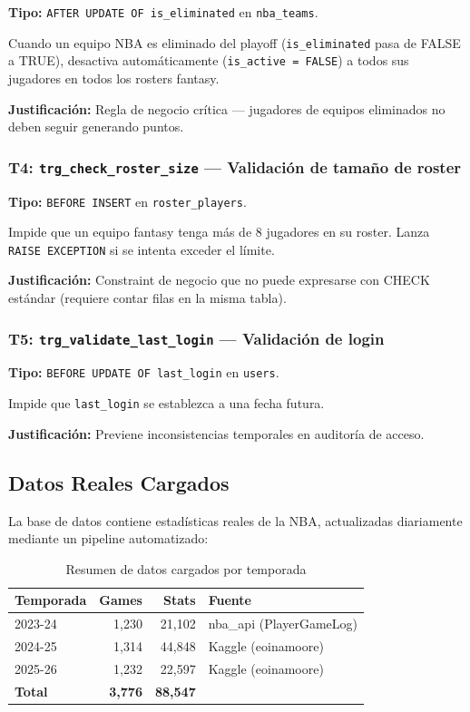 \documentclass[12pt,a4paper]{article}
\begin{document}
\textbf{Tipo:} \texttt{AFTER UPDATE OF is\_eliminated} en \texttt{nba\_teams}.

Cuando un equipo NBA es eliminado del playoff (\texttt{is\_eliminated} pasa de FALSE a TRUE),
desactiva autom\'aticamente (\texttt{is\_active = FALSE}) a todos sus jugadores en todos los rosters fantasy.

\textbf{Justificaci\'on:} Regla de negocio cr\'itica --- jugadores de equipos eliminados no deben seguir generando puntos.

\subsubsection{T4: \texttt{trg\_check\_roster\_size} --- Validaci\'on de tama\~no de roster}

\textbf{Tipo:} \texttt{BEFORE INSERT} en \texttt{roster\_players}.

Impide que un equipo fantasy tenga m\'as de 8 jugadores en su roster.
Lanza \texttt{RAISE EXCEPTION} si se intenta exceder el l\'imite.

\textbf{Justificaci\'on:} Constraint de negocio que no puede expresarse con CHECK est\'andar
(requiere contar filas en la misma tabla).

\subsubsection{T5: \texttt{trg\_validate\_last\_login} --- Validaci\'on de login}

\textbf{Tipo:} \texttt{BEFORE UPDATE OF last\_login} en \texttt{users}.

Impide que \texttt{last\_login} se establezca a una fecha futura.

\textbf{Justificaci\'on:} Previene inconsistencias temporales en auditor\'ia de acceso.

\subsection{Datos Reales Cargados}

La base de datos contiene estad\'isticas reales de la NBA, actualizadas diariamente
mediante un pipeline automatizado:

\begin{table}[h!]
\centering
\begin{tabular}{lrrl}
\toprule
\textbf{Temporada} & \textbf{Games} & \textbf{Stats} & \textbf{Fuente} \\
\midrule
2023-24 & 1,230 & 21,102 & nba\_api (PlayerGameLog) \\
2024-25 & 1,314 & 44,848 & Kaggle (eoinamoore) \\
2025-26 & 1,232 & 22,597 & Kaggle (eoinamoore) \\
\midrule
\textbf{Total} & \textbf{3,776} & \textbf{88,547} & \\
\bottomrule
\end{tabular}
\caption{Resumen de datos cargados por temporada}
\end{table}
\end{document}
